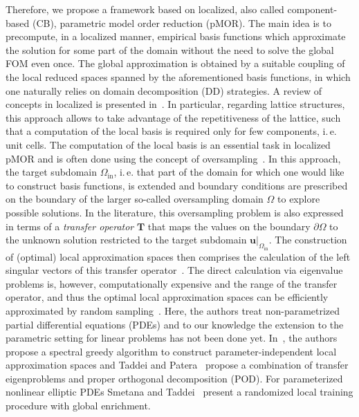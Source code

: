 \documentclass[a4paper]{eccomas_paper-2024}
\makeatletter
\newcommand{\ie}{i.\,e.\@\xspace}
\makeatother
\begin{document}
Therefore, we propose a framework based on localized, also called component-based (CB), parametric model order reduction (pMOR).
The main idea is to precompute, in a localized manner, empirical basis functions which approximate the solution for some part of the domain without the need to solve the global FOM even once.
The global approximation is obtained by a suitable coupling of the local reduced spaces spanned by the aforementioned basis functions, in which one naturally relies on domain decomposition (DD) strategies.
A review of concepts in localized  is presented in~\cite{BuhrReview}.
In particular, regarding lattice structures, this approach allows to take advantage of the repetitiveness of the lattice, such that a computation of the local basis is required only for few components, \ie{} unit cells.
The computation of the local basis is an essential task in localized pMOR and is often done using the concept of oversampling~\cite{Hou1997Multiscale}.
In this approach, the target subdomain $\varOmega_{\mathrm{in}}$, \ie{} that part of the domain for which one would like to construct basis functions, is extended and boundary conditions are prescribed on the boundary of the larger so-called oversampling domain $\varOmega$ to explore possible solutions.
In the literature, this oversampling problem is also expressed in terms of a \textit{transfer operator} $\bm{T}$ that maps the values on the boundary $\partial\varOmega$ to the unknown solution restricted to the target subdomain $\bm{u}\vert_{\varOmega_{\mathrm{in}}}$.
The construction of (optimal) local approximation spaces then comprises the calculation of the left singular vectors of this transfer operator~\cite{Babuska2011Optimal,Smetana2016Optimal}.
The direct calculation via eigenvalue problems is, however, computationally expensive and the range of the transfer operator, and thus the optimal local approximation spaces can be efficiently approximated by random sampling~\cite{Buhr2018Randomized}.
Here, the authors treat non-parametrized partial differential equations (PDEs) and to our knowledge the extension to the parametric setting for linear problems has not been done yet.
In~\cite{Smetana2016Optimal}, the authors propose a spectral greedy algorithm to construct parameter-independent local approximation spaces and Taddei and Patera~\cite{Taddei2018Localization} propose a combination of transfer eigenproblems and proper orthogonal decomposition (POD).
For parameterized nonlinear elliptic PDEs Smetana and Taddei~\cite{Smetana2023Localized} present a randomized local training procedure with global enrichment.
\end{document}
